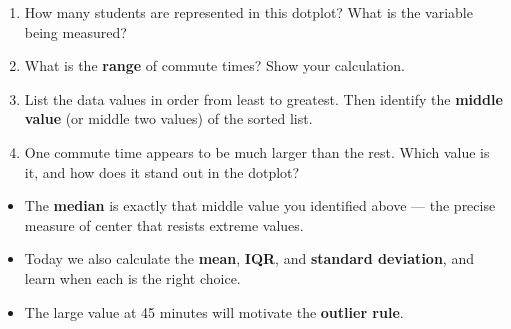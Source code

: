 \documentclass[10pt]{article}
\begin{document}
\begin{enumerate}[leftmargin=1.5em, itemsep=8pt]

  \item How many students are represented in this dotplot? What is the
        variable being measured?\\[4pt]

  \item What is the \textbf{range} of commute times? Show your calculation.\\[4pt]

  \item List the data values in order from least to greatest. Then identify
        the \textbf{middle value} (or middle two values) of the sorted list.\\[4pt]

  \item One commute time appears to be much larger than the rest. Which value
        is it, and how does it stand out in the dotplot?\\[4pt]

\end{enumerate}

\vspace{0.14in}

\begin{tcolorbox}[colback=greenbg, colframe=greenacc, boxrule=0.8pt, arc=2mm,
    left=4mm, right=4mm, top=3mm, bottom=3mm]
\small
\begin{itemize}[leftmargin=1.3em, itemsep=5pt]
  \item The \textbf{median} is exactly that middle value you identified above ---
        the precise measure of center that resists extreme values.
  \item Today we also calculate the \textbf{mean}, \textbf{IQR}, and
        \textbf{standard deviation}, and learn when each is the right choice.
  \item The large value at 45 minutes will motivate the \textbf{outlier rule}.
\end{itemize}
\end{tcolorbox}
\end{document}
